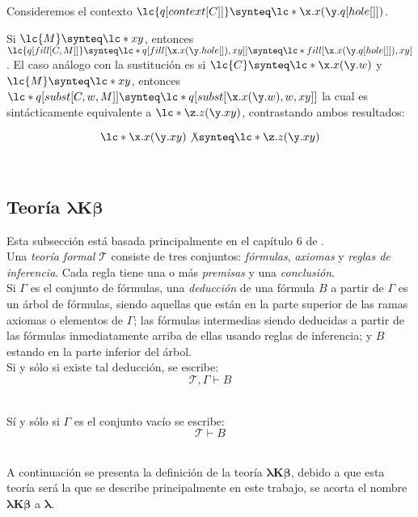\begin{ejemplo} Consideremos el contexto \(\lc{q[context[C]]} \synteq \lc*{\x.x(\y.q[hole[]])}\).

  Si \(\lc{M} \synteq \lc*{x y}\), entonces \(\lc{q[fill[C,M]]} \synteq \lc*{q[fill[\x.x(\y.hole[]), x y]]} \synteq \lc*{fill[\x.x(\y.q[hole[]]), x y]}\). El caso análogo con la sustitución es si \(\lc{C} \synteq \lc*{\x.x(\y.w)}\) y \(\lc{M} \synteq \lc*{x y}\), entonces \(\lc*{q[subst[C,w,M]]} \synteq \lc*{q[subst[\x.x(\y.w),w,x y]]}\) la cual es sintácticamente equivalente a \(\lc*{\z.z(\y.x y)}\), contrastando ambos resultados:

  \[\lc*{\x.x(\y.x y)} \not\synteq \lc*{\z.z(\y.x y)}\]
\end{ejemplo} \

\subsection{Teoría \texorpdfstring{\(\boldsymbol{\lambda K \beta}\)}{\lambda K \beta}}

Esta subsección está basada principalmente en el capítulo 6 de \cite{HindleySeldin:LambdaCalculusAndCombinators}. \\

Una \emph{teoría formal} \(\mathcal{T}\) consiste de tres conjuntos: \emph{fórmulas}, \emph{axiomas} y \emph{reglas de inferencia}. Cada regla tiene una o más \emph{premisas} y una \emph{conclusión}. \\

Si \(\Gamma\) es el conjunto de fórmulas, una \emph{deducción} de una fórmula \(B\) a partir de \(\Gamma\) es un árbol de fórmulas, siendo aquellas que están en la parte superior de las ramas axiomas o elementos de \(\Gamma\); las fórmulas intermedias siendo deducidas a partir de las fórmulas inmediatamente arriba de ellas usando reglas de inferencia; y \(B\) estando en la parte inferior del árbol. \\

Si y sólo si existe tal deducción, se escribe: \\

\[\mathcal{T},\Gamma \vdash B\] \

Sí y sólo si \(\Gamma\) es el conjunto vacío se escribe: \\

\[\mathcal{T} \vdash B\] \

A continuación se presenta la definición de la teoría \(\boldsymbol{\lambda K \beta}\), debido a que esta teoría será la que se describe principalmente en este trabajo, se acorta el nombre \(\boldsymbol{\lambda K \beta}\) a \(\boldsymbol{\lambda}\). \\

